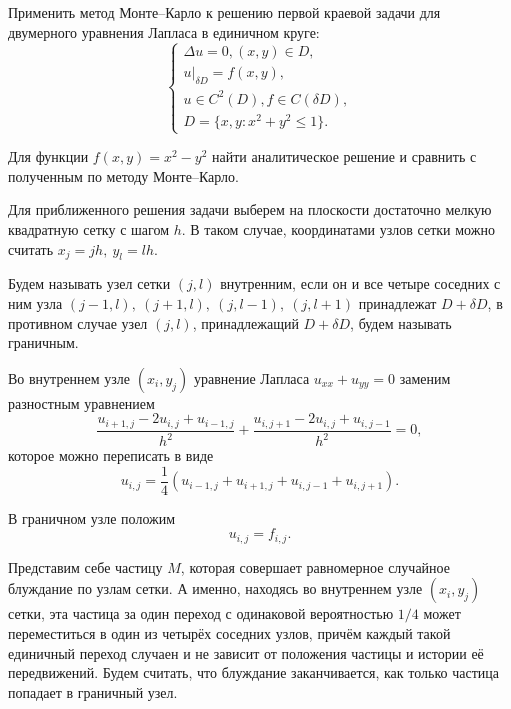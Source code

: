 
Применить метод Монте--Карло к решению первой краевой задачи для двумерного 
 уравнения Лапласа в единичном круге:
\begin{equation} \label{Dirichlet}
\left\lbrace
\begin{array}{lcr}
\Delta u=0,(x,y)\in D,\\
u|_{\delta D}=f(x,y),\\
u\in C^2(D),f\in C(\delta D),\\
D=\lbrace x,y:x^2+y^2\leqslant1\rbrace.
\end{array}
\right.
\end{equation}

Для функции \( f(x,y)=x^2-y^2 \) найти аналитическое решение и сравнить с 
 полученным по методу Монте--Карло.



Для приближенного решения задачи выберем на плоскости достаточно мелкую
квадратную сетку с шагом $h$. В таком случае, координатами узлов сетки 
 можно считать $x_j = jh, \ y_l = lh.$

\begin{definition}
	Будем называть узел сетки $(j, l)$ внутренним, если он и все четыре 
     соседних с ним узла
	$(j-1, l), \ (j + 1, l), \ (j, l - 1), \ (j, l + 1)$ принадлежат $D + 
     \delta D$, в противном случае узел $(j, l)$, принадлежащий $D + 
     \delta D$, будем называть граничным.
\end{definition} 

Во внутреннем узле \( (x_i,y_j) \) уравнение Лапласа \( u_{xx}+u_{yy}=0 \) 
 заменим разностным уравнением
\[
 \dfrac{u_{i + 1, j} - 2 u_{i, j} + u_{i - 1, j}}{h^2} + \dfrac{u_{i, j + 1} - 
  2 u_{i, j} + u_{i, j - 1}} {h^2} = 0,
\]
которое можно переписать в виде
\begin{equation} \label{internal}
u_{i,j}=\dfrac{1}{4}(u_{i-1,j}+u_{i+1,j}+u_{i,j-1}+u_{i,j+1}).
\end{equation}

В граничном узле положим
\begin{equation} \label{borders}
u_{i,j}=f_{i,j}.
\end{equation}

 

Представим себе частицу \( M \), которая совершает равномерное случайное 
 блуждание по узлам сетки. А именно, находясь во внутреннем узле 
 \( (x_i,y_j) \) сетки, эта частица за один переход с одинаковой 
 вероятностью \( 1/4 \) может переместиться в один из четырёх соседних 
 узлов, причём каждый такой единичный переход случаен и не зависит от 
 положения частицы и истории её передвижений. Будем считать, что блуждание 
 заканчивается, как только частица попадает в граничный узел. 

